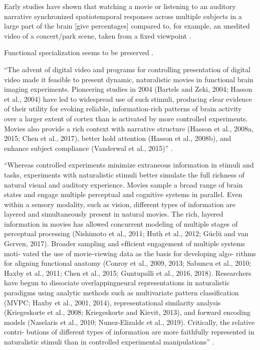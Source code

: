 %
Early studies have shown that watching a movie or listening to an auditory
narrative synchronized spatiotemporal responses across multiple subjects in a
large part of the brain [give percentages] \citep{hasson2010reliability,
lankinen2014isc-meg} compared to, for example, an unedited video of a
concert/park scene, taken from a fixed viewpoint
\citep{hasson2010reliability}.

%
Functional specialization seems to be preserved
\citep{bartels2004mapping}.



%
``The advent of digital video and programs for controlling presentation of
digital video made it feasible to present dynamic, naturalistic movies in
functional brain imaging experiments. Pioneering studies in 2004 (Bartels and
Zeki, 2004; Hasson et al., 2004) have led to widespread use of such stimuli,
producing clear evidence of their utility for evoking reliable, information-rich
patterns of brain activity over a larger extent of cortex than is activated by
more controlled experiments. Movies also provide a rich context with narrative
structure (Hasson et al., 2008a, 2015; Chen et al., 2017), better hold attention
(Hasson et al., 2008b), and enhance subject compliance (Vanderwal et al.,
2015)'' \citep{haxby2020naturalistic}.

``Whereas controlled experiments minimize extraneous information in stimuli and
tasks, experiments with naturalistic stimuli better simulate the full richness
of natural visual and auditory experience. Movies sample a broad range of brain
states and engage multiple perceptual and cognitive systems in parallel. Even
within a sensory modality, such as vision, different types of information are
layered and simultaneously present in natural movies. The rich, layered
information in movies has allowed concurrent modeling of multiple stages of
perceptual processing (Nishimoto et al., 2011; Huth et al., 2012; Güclü and van
Gerven, 2017). Broader sampling and efﬁcient engagement of multiple systems
moti- vated the use of movie-viewing data as the basis for developing algo-
rithms for aligning functional anatomy (Conroy et al., 2009, 2013; Sabuncu et
al., 2010; Haxby et al., 2011; Chen et al., 2015; Guntupalli et al., 2016,
2018). Researchers have begun to dissociate overlappingneural representations in
naturalistic paradigms using analytic methods such as multivariate pattern
classiﬁcation (MVPC; Haxby et al., 2001, 2014), representational similarity
analysis (Kriegeskorte et al., 2008; Kriegeskorte and Kievit, 2013), and forward
encoding models (Naselaris et al., 2010; Nunez-Elizalde et al., 2019).
Critically, the relative contri- butions of different types of information are
more faithfully represented in naturalistic stimuli than in controlled
experimental manipulations'' \citep{haxby2020naturalistic}.

